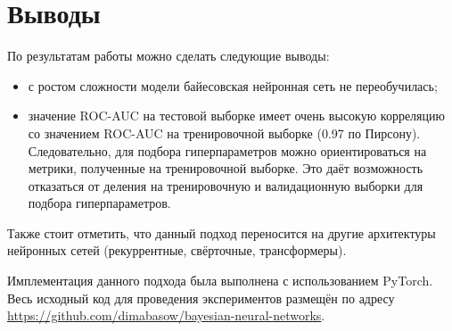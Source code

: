 \documentclass{article}
\numberwithin{equation}{section}
\begin{document}
    \section{Выводы}
    По результатам работы можно сделать следующие выводы:
    \begin{itemize}
        \item с ростом сложности модели байесовская нейронная сеть не переобучилась;
        \item значение ROC-AUC на тестовой выборке
        имеет очень высокую корреляцию со значением ROC-AUC на тренировочной выборке (0.97 по Пирсону).
        Следовательно, для подбора гиперпараметров можно ориентироваться на метрики,
        полученные на тренировочной выборке.
        Это даёт возможность отказаться от деления на тренировочную и валидационную выборки
        для подбора гиперпараметров.
    \end{itemize}

    Также стоит отметить,
    что данный подход переносится на другие архитектуры нейронных сетей
    (рекуррентные, свёрточные, трансформеры).

    Имплементация данного подхода была выполнена с использованием PyTorch.
    Весь исходный код для проведения экспериментов размещён по адресу
    \url{https://github.com/dimabasow/bayesian-neural-networks}.
\end{document}

